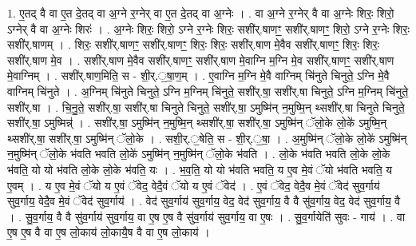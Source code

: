 \documentclass[17pt]{extarticle}
\begin{document}
1. ए॒तद् वै वा ए॒त दे॒तद् वा अ॒ग्ने र॒ग्नेर् वा ए॒त दे॒तद् वा अ॒ग्नेः । . वा अ॒ग्ने र॒ग्नेर् वै वा अ॒ग्नेः शिरः॒ शिरो॒ ऽग्नेर् वै वा अ॒ग्नेः शिरः॑ । . अ॒ग्नेः शिरः॒ शिरो॒ ऽग्ने र॒ग्नेः शिरः॒ सशी॑र्.षाणꣳ॒॒ सशी॑र्.षाणꣳ॒॒ शिरो॒ ऽग्ने र॒ग्नेः शिरः॒ सशी॑र्.षाणम् । . शिरः॒ सशी॑र्.षाणꣳ॒॒ सशी॑र्.षाणꣳ॒॒ शिरः॒ शिरः॒ सशी॑र्.षाण मे॒वैव सशी॑र्.षाणꣳ॒॒ शिरः॒ शिरः॒ सशी॑र्.षाण मे॒व । . सशी॑र्.षाण मे॒वैव सशी॑र्.षाणꣳ॒॒ सशी॑र्.षाण मे॒वाग्नि म॒ग्नि मे॒व सशी॑र्.षाणꣳ॒॒ सशी॑र्.षाण मे॒वाग्निम् । . सशी॑र्.षाण॒मिति॒ स - शी॒र्.॒षा॒ण॒म् । . ए॒वाग्नि म॒ग्नि मे॒वै वाग्निम् चि॑नुते चिनुते॒ ऽग्नि मे॒वै वाग्निम् चि॑नुते । . अ॒ग्निम् चि॑नुते चिनुते॒ ऽग्नि म॒ग्निम् चि॑नुते॒ सशी॑र्.षा॒ सशी॑र्.षा चिनुते॒ ऽग्नि म॒ग्निम् चि॑नुते॒ सशी॑र्.षा । . चि॒नु॒ते॒ सशी॑र्.षा॒ सशी॑र्.षा चिनुते चिनुते॒ सशी॑र्.षा॒ ऽमुष्मि॑न् न॒मुष्मि॒न् थ्सशी॑र्.षा चिनुते चिनुते॒ सशी॑र्.षा॒ ऽमुष्मिन्न्॑ । . सशी॑र्.षा॒ ऽमुष्मि॑न् न॒मुष्मि॒न् थ्सशी॑र्.षा॒ सशी॑र्.षा॒ ऽमुष्मि॑न् ॅलो॒के लो॒के॑ ऽमुष्मि॒न् थ्सशी॑र्.षा॒ सशी॑र्.षा॒ ऽमुष्मि॑न् ॅलो॒के । . सशी॒र्.॒षेति॒ स - शी॒र्.॒षा॒ । . अ॒मुष्मि॑न् ॅलो॒के लो॒के॑ ऽमुष्मि॑न् न॒मुष्मि॑न् ॅलो॒के भ॑वति भवति लो॒के॑ ऽमुष्मि॑न् न॒मुष्मि॑न् ॅलो॒के भ॑वति । . लो॒के भ॑वति भवति लो॒के लो॒के भ॑वति॒ यो यो भ॑वति लो॒के लो॒के भ॑वति॒ यः । . भ॒व॒ति॒ यो यो भ॑वति भवति॒ य ए॒व मे॒वं ॅयो भ॑वति भवति॒ य ए॒वम् । . य ए॒व मे॒वं ॅयो य ए॒वं ॅवेद॒ वेदै॒वं ॅयो य ए॒वं ॅवेद॑ । . ए॒वं ॅवेद॒ वेदै॒व मे॒वं ॅवेद॑ सुव॒र्गाय॑ सुव॒र्गाय॒ वेदै॒व मे॒वं ॅवेद॑ सुव॒र्गाय॑ । . वेद॑ सुव॒र्गाय॑ सुव॒र्गाय॒ वेद॒ वेद॑ सुव॒र्गाय॒ वै वै सु॑व॒र्गाय॒ वेद॒ वेद॑ सुव॒र्गाय॒ वै । . सु॒व॒र्गाय॒ वै वै सु॑व॒र्गाय॑ सुव॒र्गाय॒ वा ए॒ष ए॒ष वै सु॑व॒र्गाय॑ सुव॒र्गाय॒ वा ए॒षः । . सु॒व॒र्गायेति॑ सुवः - गाय॑ । . वा ए॒ष ए॒ष वै वा ए॒ष लो॒काय॑ लो॒कायै॒ष वै वा ए॒ष लो॒काय॑ । \newline
\end{document}
